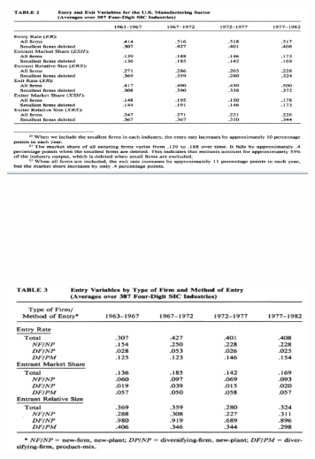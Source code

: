 \documentclass[dvipdfmx,14pt]{beamer}
\begin{document}
\begin{frame}

\begin{center}

\includegraphics[width=9cm,height=7.75cm]{DRS_T2.pdf}

\end{center}

\end{frame}

\begin{frame}

\begin{center}

\includegraphics[width=9cm,height=7.75cm]{DRS_T3.pdf}

\end{center}

\end{frame}
\end{document}
